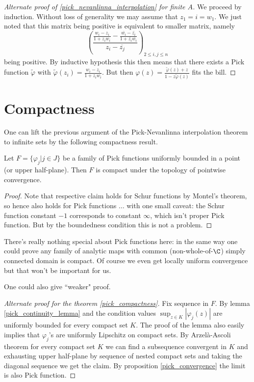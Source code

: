 \begin{proof}[Alternate proof of \ref{pick_nevanlinna_interpolation} for finite $A$]
	We proceed by induction. Without loss of generality we may assume that $z_{1} = i = w_{1}$. We just noted that this matrix being positive is equivalent to smaller matrix, namely
	\[
		\left(\frac{\frac{w_{i} - z_{i}}{1 + z_{i} w_{i}} - \frac{\overline{w_{i}} - \overline{z_{i}}}{1 + \overline{z_{i}} \overline{w_{i}}}}{z_{i} - \overline{z_{j}}}\right)_{2 \leq i, j \leq n}
	\]
	being positive. By inductive hypothesis this then means that there exists a Pick function $\tilde{\varphi}$ with $\tilde{\varphi}(z_{i}) = \frac{w_{i} - z_{i}}{1 + z_{i} w_{i}}$. But then $\varphi(z) = \frac{\tilde{\varphi}(z) + z}{1 - z \tilde{\varphi}(z)}$ fits the bill.
\end{proof}

\section{Compactness}

One can lift the previous argument of the Pick-Nevanlinna interpolation theorem to infinite sets by the following compactness result.

\begin{lause}\label{pick_compactness}
	Let $F = \{\varphi_{j} | j \in J \}$ be a family of Pick functions uniformly bounded in a point (or upper half-plane). Then $F$ is compact under the topology of pointwise convergence.
\end{lause}
\begin{proof}
	Note that respective claim holds for Schur functions by Montel's theorem, so hence also holds for Pick functions $\ldots$ with one small caveat: the Schur function constant $-1$ corresponds to constant $\infty$, which isn't proper Pick function. But by the boundedness condition this is not a problem.
\end{proof}

There's really nothing special about Pick functions here: in the same way one could prove any family of analytic maps with common (non-whole-of-$\C$) simply connected domain is compact. Of course we even get locally uniform convergence but that won't be important for us.

One could also give ``weaker" proof.

\begin{proof}[Alternate proof for the theorem \ref{pick_compactness}]
	Fix sequence in $F$. By lemma \ref{pick_continuity_lemma} and the condition values $\sup_{z \in K}|\varphi_{j}(z)|$ are uniformly bounded for every compact set $K$. The proof of the lemma also easily implies that $\varphi_{j}$'s are uniformly Lipschitz on compact sets. By Arzel\`{a}-Ascoli theorem for every compact set $K$ we can find a subsequence convergent in $K$ and exhausting upper half-plane by sequence of nested compact sets and taking the diagonal sequence we get the claim. By proposition \ref{pick_convergence} the limit is also Pick function.
\end{proof}

